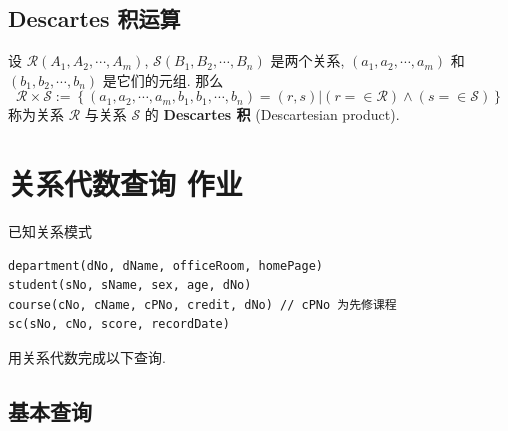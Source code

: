 \documentclass[10pt,UTF8]{book} %
\begin{document}
\subsection{Descartes 积运算}

\begin{definition}[Descartes 积]
    设 $\mathcal{R}(A_1, A_2, \cdots, A_m)$, $\mathcal{S}
    (B_1, B_2, \cdots, B_n)$ 是两个关系, 
    $(a_1, a_2, \cdots, a_m)$ 和
    $(b_1, b_2, \cdots, b_n)$ 是它们的元组.
    那么
    \[ \mathcal{R} \times \mathcal{S} := \left\{
        (a_1, a_2, \cdots, a_m, b_1, b_1, \cdots, b_n)
        = (r,s) | (r= \in \mathcal{R})
        \wedge (s =  \in \mathcal{S})
    \right\} \]
    称为关系 $\mathcal{R}$ 与关系 $\mathcal{S}$ 的 \textbf{Descartes 积}
    (Descartesian product).
\end{definition}

\newpage
\section{关系代数查询 \quad 作业}

已知关系模式
\begin{lstlisting}
department(dNo, dName, officeRoom, homePage)
student(sNo, sName, sex, age, dNo)
course(cNo, cName, cPNo, credit, dNo) // cPNo 为先修课程
sc(sNo, cNo, score, recordDate)
\end{lstlisting}
用关系代数完成以下查询.

\subsection{基本查询}
\end{document}
